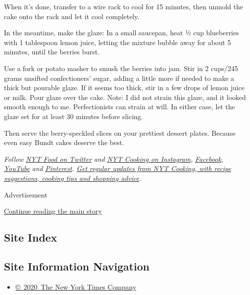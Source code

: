 When it's done, transfer to a wire rack to cool for 15 minutes, then
unmold the cake onto the rack and let it cool completely.

In the meantime, make the glaze: In a small saucepan, heat ½ cup
blueberries with 1 tablespoon lemon juice, letting the mixture bubble
away for about 5 minutes, until the berries burst.

Use a fork or potato masher to smush the berries into jam. Stir in 2
cups/245 grams unsifted confectioners' sugar, adding a little more if
needed to make a thick but pourable glaze. If it seems too thick, stir
in a few drops of lemon juice or milk. Pour glaze over the cake. Note: I
did not strain this glaze, and it looked smooth enough to me.
Perfectionists can strain at will. In either case, let the glaze set for
at least 30 minutes before slicing.

Then serve the berry-speckled slices on your prettiest dessert plates.
Because even easy Bundt cakes deserve the best.

\emph{Follow} \href{https://twitter.com/nytfood}{\emph{NYT Food on
Twitter}} \emph{and}
\href{https://www.instagram.com/nytcooking/}{\emph{NYT Cooking on
Instagram}}\emph{,}
\href{https://www.facebookcorewwwi.onion/nytcooking/}{\emph{Facebook}}\emph{,}
\href{https://www.youtube.com/nytcooking}{\emph{YouTube}} \emph{and}
\href{https://www.pinterest.com/nytcooking/}{\emph{Pinterest}}\emph{.}
\href{https://www.nytimes3xbfgragh.onion/newsletters/cooking}{\emph{Get
regular updates from NYT Cooking, with recipe suggestions, cooking tips
and shopping advice}}\emph{.}

Advertisement

\protect\hyperlink{after-bottom}{Continue reading the main story}

\hypertarget{site-index}{%
\subsection{Site Index}\label{site-index}}

\hypertarget{site-information-navigation}{%
\subsection{Site Information
Navigation}\label{site-information-navigation}}

\begin{itemize}
\tightlist
\item
  \href{https://help.nytimes3xbfgragh.onion/hc/en-us/articles/115014792127-Copyright-notice}{©~2020~The
  New York Times Company}
\end{itemize}

